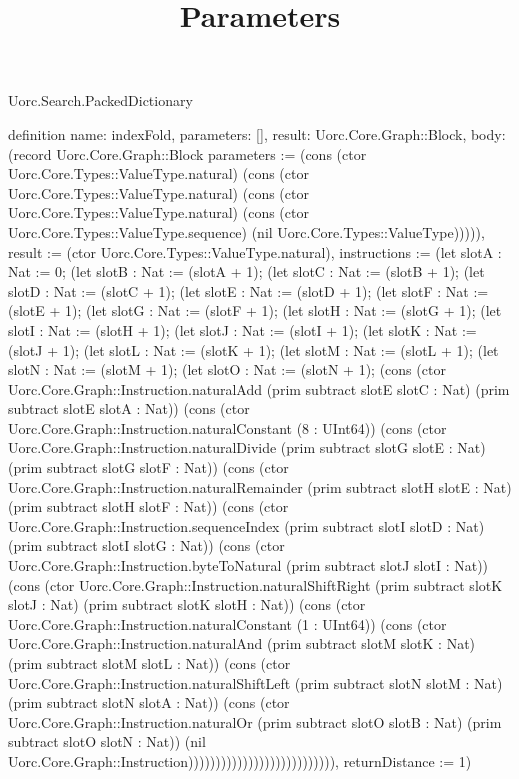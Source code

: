 \begin{lexlean}{Uorc.Search.PackedDictionary}
\title{Parameters}
\begin{semanticmodule}
definition{
  name: indexFold,
  parameters: [],
  result: Uorc.Core.Graph::Block,
  body: (record Uorc.Core.Graph::Block {parameters := (cons (ctor Uorc.Core.Types::ValueType.natural) (cons (ctor Uorc.Core.Types::ValueType.natural) (cons (ctor Uorc.Core.Types::ValueType.natural) (cons (ctor Uorc.Core.Types::ValueType.sequence) (nil Uorc.Core.Types::ValueType))))), result := (ctor Uorc.Core.Types::ValueType.natural), instructions := (let slotA : Nat := 0; (let slotB : Nat := (slotA + 1); (let slotC : Nat := (slotB + 1); (let slotD : Nat := (slotC + 1); (let slotE : Nat := (slotD + 1); (let slotF : Nat := (slotE + 1); (let slotG : Nat := (slotF + 1); (let slotH : Nat := (slotG + 1); (let slotI : Nat := (slotH + 1); (let slotJ : Nat := (slotI + 1); (let slotK : Nat := (slotJ + 1); (let slotL : Nat := (slotK + 1); (let slotM : Nat := (slotL + 1); (let slotN : Nat := (slotM + 1); (let slotO : Nat := (slotN + 1); (cons (ctor Uorc.Core.Graph::Instruction.naturalAdd (prim subtract slotE slotC : Nat) (prim subtract slotE slotA : Nat)) (cons (ctor Uorc.Core.Graph::Instruction.naturalConstant (8 : UInt64)) (cons (ctor Uorc.Core.Graph::Instruction.naturalDivide (prim subtract slotG slotE : Nat) (prim subtract slotG slotF : Nat)) (cons (ctor Uorc.Core.Graph::Instruction.naturalRemainder (prim subtract slotH slotE : Nat) (prim subtract slotH slotF : Nat)) (cons (ctor Uorc.Core.Graph::Instruction.sequenceIndex (prim subtract slotI slotD : Nat) (prim subtract slotI slotG : Nat)) (cons (ctor Uorc.Core.Graph::Instruction.byteToNatural (prim subtract slotJ slotI : Nat)) (cons (ctor Uorc.Core.Graph::Instruction.naturalShiftRight (prim subtract slotK slotJ : Nat) (prim subtract slotK slotH : Nat)) (cons (ctor Uorc.Core.Graph::Instruction.naturalConstant (1 : UInt64)) (cons (ctor Uorc.Core.Graph::Instruction.naturalAnd (prim subtract slotM slotK : Nat) (prim subtract slotM slotL : Nat)) (cons (ctor Uorc.Core.Graph::Instruction.naturalShiftLeft (prim subtract slotN slotM : Nat) (prim subtract slotN slotA : Nat)) (cons (ctor Uorc.Core.Graph::Instruction.naturalOr (prim subtract slotO slotB : Nat) (prim subtract slotO slotN : Nat)) (nil Uorc.Core.Graph::Instruction))))))))))))))))))))))))))), returnDistance := 1})
}


\end{semanticmodule}
\end{lexlean}
